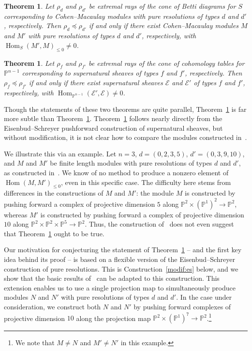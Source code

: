 \documentclass[12pt]{amsart}
\newtheorem{thm}[equation]{Theorem}
\theoremstyle{definition}
\newcommand{\Hom}{\operatorname{Hom}}
\newcommand{\EE}{\mathcal{E}}
\newcommand{\PP}{\mathbb{P}}
\begin{document}
\begin{thm}\label{thm:poset:deg:main}
Let $\rho_d$ and $\rho_{d'}$ be extremal rays of the cone of Betti diagrams
for $S$ corresponding to Cohen--Macaulay modules with pure resolutions of
types $d$ and $d'$, respectively. 
Then $\rho_d \preceq \rho_{d'}$ if and only if there
exist Cohen--Macaulay modules $M$ and $M'$ with pure resolutions of types
$d$ and $d'$, respectively, with $\Hom_S(M',M)_{\leq 0}\ne 0$.
\end{thm}

\begin{thm}\label{thm:poset:root:main}
Let $\rho_f$ and $\rho_{f'}$ be extremal rays of the cone of cohomology
tables for $\PP^{n-1}$ corresponding to supernatural sheaves of types $f$
and $f'$, respectively. 
Then $\rho_f\preceq \rho_{f'}$ if and only if there exist
supernatural sheaves $\EE$ and $\EE'$ of types $f$ and $f'$, respectively,
with $\Hom_{\PP^{n-1}}(\EE',\EE)\ne 0$.
\end{thm}

Though the statements of these two theorems are quite parallel,
Theorem~\ref{thm:poset:deg:main} is far more subtle than
Theorem~\ref{thm:poset:root:main}.  Theorem~\ref{thm:poset:root:main}
follows nearly directly from the Eisenbud--Schreyer pushforward
construction of supernatural sheaves, but without modification, 
it is not clear how to compare the modules constructed 
in~\cite[\S5]{EiScConjOfBS07}.

We illustrate this via an example.  Let $n=3$, $d=(0,2,3,5)$,
$d'=(0,3,9,10)$, and $M$ and $M'$ be finite length modules with
pure resolutions of types $d$ and $d'$, as constructed
in~\cite[\S5]{EiScConjOfBS07}.  
We know of no method to produce a nonzero element of $\Hom(M,M')_{\leq 0}$, 
even in this specific case.
The difficulty here stems from differences in the constructions of $M$ and
$M'$: the module $M$ is constructed by pushing forward a complex of
projective dimension $5$ along $\PP^2\times (\PP^1)^2\to \PP^2$,
whereas $M'$ is constructed by pushing forward a complex of
projective dimension $10$ along $\PP^2\times \PP^2\times \PP^5\to\PP^2$.  
Thus, the construction of~\cite[\S5]{EiScConjOfBS07} does not
even suggest that Theorem~\ref{thm:poset:deg:main} ought to be true.

Our motivation for conjecturing the statement of 
Theorem~\ref{thm:poset:deg:main} -- and the first key idea behind its proof -- 
is based on a flexible version of the Eisenbud--Schreyer construction of 
pure resolutions. This is Construction~\ref{modif:es} below, 
and we show that the basic results of~\cite[\S5]{EiScConjOfBS07} can be 
adapted to this construction. This extension enables us to use a single 
projection map to simultaneously produce modules $N$ and $N'$ with pure 
resolutions of types $d$ and $d'$.  In the case under consideration, 
we construct both $N$ and $N'$ by pushing forward complexes 
of projective dimension $10$ along the projection map 
$\PP^2\times (\PP^1)^7\to \PP^2$.\footnote{We note that $M\ne N$ 
and $M'\ne N'$ in this example.}
\end{document}
